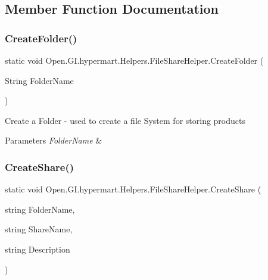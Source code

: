 \subsection{Member Function Documentation}
\hypertarget{class_open_1_1_g_i_1_1hypermart_1_1_helpers_1_1_file_share_helper_a8e938d7ae2d931ab892c0ebf964ee4d2}{}\label{class_open_1_1_g_i_1_1hypermart_1_1_helpers_1_1_file_share_helper_a8e938d7ae2d931ab892c0ebf964ee4d2} 
\subsubsection{\texorpdfstring{Create\+Folder()}{CreateFolder()}}
{\footnotesize\ttfamily static void Open.\+G\+I.\+hypermart.\+Helpers.\+File\+Share\+Helper.\+Create\+Folder (\begin{DoxyParamCaption}\item[{String}]{Folder\+Name }\end{DoxyParamCaption})\hspace{0.3cm}{\ttfamily [static]}}



Create a Folder -\/ used to create a file System for storing products 


\begin{DoxyParams}{Parameters}
{\em Folder\+Name} & \\
\hline
\end{DoxyParams}
\hypertarget{class_open_1_1_g_i_1_1hypermart_1_1_helpers_1_1_file_share_helper_af08f7c0abe722a41623b0ae56f78a927}{}\label{class_open_1_1_g_i_1_1hypermart_1_1_helpers_1_1_file_share_helper_af08f7c0abe722a41623b0ae56f78a927} 
\subsubsection{\texorpdfstring{Create\+Share()}{CreateShare()}}
{\footnotesize\ttfamily static void Open.\+G\+I.\+hypermart.\+Helpers.\+File\+Share\+Helper.\+Create\+Share (\begin{DoxyParamCaption}\item[{string}]{Folder\+Name,  }\item[{string}]{Share\+Name,  }\item[{string}]{Description }\end{DoxyParamCaption})\hspace{0.3cm}{\ttfamily [static]}}



